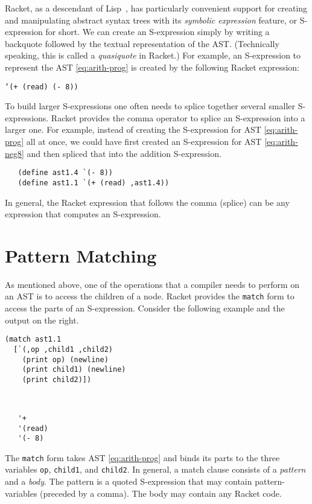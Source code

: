 \documentclass[12pt]{book}
\begin{document}
Racket, as a descendant of Lisp~\citep{McCarthy:1960dz}, has
particularly convenient support for creating and manipulating abstract
syntax trees with its \emph{symbolic expression} feature, or
S-expression for short. We can create an S-expression simply by
writing a backquote followed by the textual representation of the
AST. (Technically speaking, this is called a \emph{quasiquote} in
Racket.)  For example, an S-expression to represent the AST
\eqref{eq:arith-prog} is created by the following Racket expression:
\begin{center}
\texttt{`(+ (read) (- 8))}
\end{center}

To build larger S-expressions one often needs to splice together
several smaller S-expressions. Racket provides the comma operator to
splice an S-expression into a larger one. For example, instead of
creating the S-expression for AST \eqref{eq:arith-prog} all at once,
we could have first created an S-expression for AST
\eqref{eq:arith-neg8} and then spliced that into the addition
S-expression.
\begin{lstlisting}
   (define ast1.4 `(- 8))
   (define ast1.1 `(+ (read) ,ast1.4))
\end{lstlisting}
In general, the Racket expression that follows the comma (splice)
can be any expression that computes an S-expression.

\section{Pattern Matching}
\label{sec:pattern-matching}

As mentioned above, one of the operations that a compiler needs to
perform on an AST is to access the children of a node.  Racket
provides the \texttt{match} form to access the parts of an
S-expression. Consider the following example and the output on the
right.
\begin{center}
\begin{minipage}{0.5\textwidth}
\begin{lstlisting}
(match ast1.1
  [`(,op ,child1 ,child2)
    (print op) (newline)
    (print child1) (newline)
    (print child2)])
\end{lstlisting}
\end{minipage}
\vrule
\begin{minipage}{0.25\textwidth}
\begin{lstlisting}


   '+
   '(read)
   '(- 8)
\end{lstlisting}
\end{minipage}
\end{center}
The \texttt{match} form takes AST \eqref{eq:arith-prog} and binds its
parts to the three variables \texttt{op}, \texttt{child1}, and
\texttt{child2}. In general, a match clause consists of a
\emph{pattern} and a \emph{body}. The pattern is a quoted S-expression
that may contain pattern-variables (preceded by a comma).  The body
may contain any Racket code.
\end{document}
